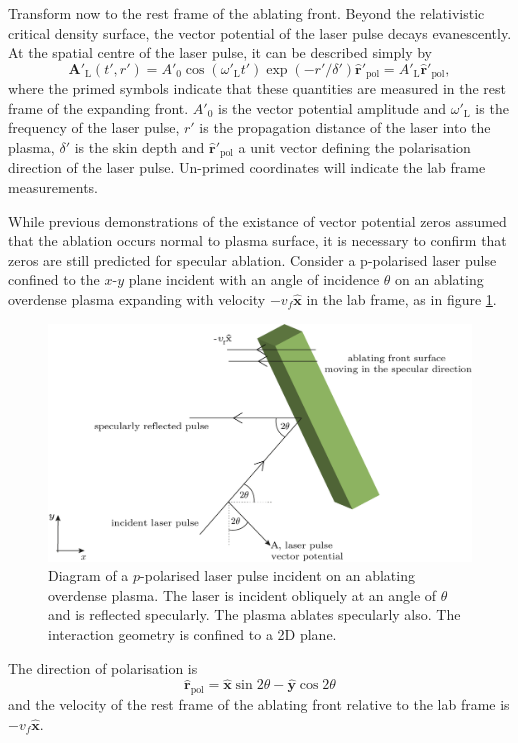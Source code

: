 Transform now to the rest frame of the ablating front. Beyond the relativistic critical density surface, the vector potential of the laser pulse decays evanescently. At the spatial centre of the laser pulse, it can be described simply by
\begin{equation}
	\mathbf{A}'_\mathrm{L}(t',r') = A'_0\cos(\omega'_\mathrm{L}t')\exp(-r'/\delta')\hat{\mathbf{r}}'_\mathrm{pol}= A'_\mathrm{L}\hat{\mathbf{r}}'_\mathrm{pol},
\end{equation}
where the primed symbols indicate that these quantities are measured in the rest frame of the expanding front. $A'_0$ is the vector potential amplitude and $\omega'_\mathrm{L}$ is the frequency of the laser pulse, $r'$ is the propagation distance of the laser into the plasma, $\delta'$ is the skin depth and $\hat{\mathbf{r}}'_\mathrm{pol}$ a unit vector defining the polarisation direction of the laser pulse. Un-primed coordinates will indicate the lab frame measurements.


While previous demonstrations of the existance of vector potential zeros assumed that the ablation occurs normal to plasma surface, it is necessary to confirm that zeros are still predicted for specular ablation. Consider a p-polarised laser pulse confined to the $x$-$y$ plane incident with an angle of incidence $\theta$ on an ablating overdense plasma expanding with velocity $-v_f\hat{\mathbf{x}}$ in the lab frame, as in figure \ref{fig:zvp_ablatingfront}.

\begin{figure}
	\centering
	\includegraphics[width=0.7\linewidth]{figures/zvp/zvp_ablating_front}
	\caption[Diagram of a $p$-polarised laser pulse incident on an ablating overdense plasma.]{Diagram of a $p$-polarised laser pulse incident on an ablating overdense plasma. The laser is incident obliquely at an angle of $\theta$ and is reflected specularly. The plasma ablates specularly also. The interaction geometry is confined to a 2D plane.}
	\label{fig:zvp_ablatingfront}
\end{figure}
The direction of polarisation is
\begin{equation}
	\hat{\mathbf{r}}_\mathrm{pol} = \hat{\mathbf{x}}\sin{2\theta} - \hat{\mathbf{y}}\cos{2\theta}
\end{equation}
and the velocity of the rest frame of the ablating front relative to the lab frame is $-v_f\hat{\mathbf{x}}$.

